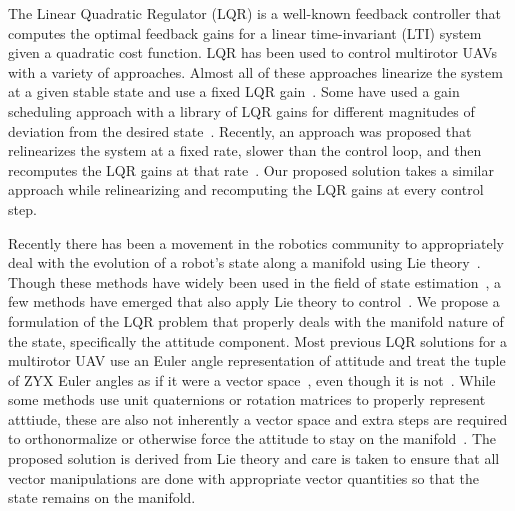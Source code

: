 

The Linear Quadratic Regulator (LQR) is a well-known feedback controller that
computes the optimal feedback gains for a linear time-invariant (LTI) system
given a quadratic cost function. LQR has been used to control multirotor UAVs with a variety of
approaches. Almost all of these approaches
linearize the system at a given stable state and use a fixed LQR
gain~\cite{cowling2007prototype}. Some have
used a gain scheduling approach with a library of LQR gains for different
magnitudes of deviation from the desired state~\cite{reyes2013lqr}. Recently, an approach was
proposed that relinearizes the system at a fixed rate, slower than the control
loop, and then recomputes the LQR gains at that rate~\cite{foehn2018onboard}. Our
proposed solution takes a similar approach while relinearizing and recomputing
the LQR gains at every control step. 

Recently there has been a movement in the robotics community to appropriately
deal with the evolution of a robot's state along a manifold using Lie
theory~\cite{sola2018micro}. Though these methods have widely been used in the
field of state estimation~\cite{sola2017quaternion,koch2017relative}, a
few methods have emerged that also apply Lie theory to
control~\cite{yu2015high,lee2010geometric}. We propose a formulation of
the LQR problem that properly deals with the manifold nature of the state,
specifically the attitude component. Most previous LQR solutions
for a multirotor UAV use an Euler angle representation of attitude and treat the
tuple of ZYX Euler angles as if it were a vector space~\cite{cowling2007prototype}, even
though it is not~\cite{diebel2006representing}. While some methods use unit
quaternions or rotation matrices to properly represent atttiude, these are also
not inherently a vector space and extra steps are required to orthonormalize or
otherwise force the attitude to stay on the
manifold~\cite{reyes2013lqr,foehn2018onboard}. The proposed solution is
derived from Lie theory and care is taken to ensure that all vector
manipulations are done with
appropriate vector quantities so that the state remains on the manifold.

